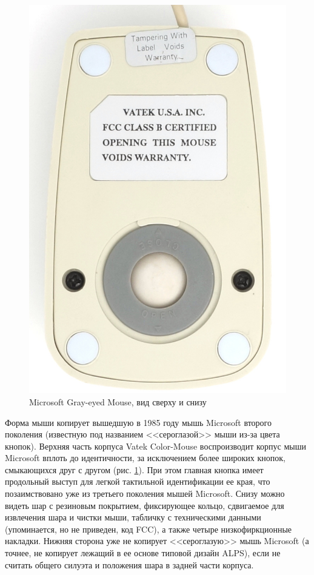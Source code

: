 \documentclass[11pt, a4paper]{article}
\begin{document}
\begin{figure}[h]
    \includegraphics[scale=0.55]{1989_vatek_color_mouse/bottom_30.jpg}
    \caption{Microsoft Gray-eyed Mouse, вид сверху и снизу}
    \label{fig:VatekColorTopAndBottom}
\end{figure}

Форма мыши копирует вышедшую в 1985 году мышь Microsoft второго поколения (известную под названием <<сероглазой>> мыши из-за цвета кнопок). Верхняя часть корпуса Vatek Color-Mouse воспроизводит корпус мыши Microsoft вплоть до идентичности, за исключением более широких кнопок, смыкающихся друг с другом (рис. \ref{fig:VatekColorTopAndBottom}). При этом главная кнопка имеет продольный выступ для легкой тактильной идентификации ее края, что позаимствовано уже из третьего поколения мышей Microsoft.
Снизу можно видеть шар с резиновым покрытием, фиксирующее кольцо, сдвигаемое для извлечения шара и чистки мыши, табличку с техническими данными (упоминается, но не приведен, код FCC), а также четыре низкофиркционные накладки. Нижняя сторона уже не копирует <<сероглазую>> мышь Microsoft (а точнее, не копирует лежащий в ее основе типовой дизайн ALPS), если не считать общего силуэта и положения шара в задней части корпуса.
\end{document}
